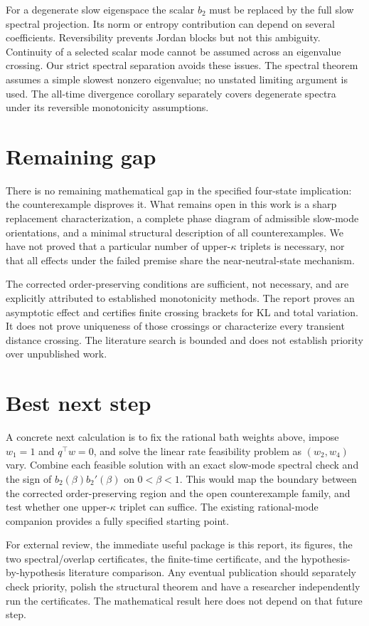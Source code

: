 \documentclass[11pt]{article}
\begin{document}
For a degenerate slow eigenspace the scalar $b_2$ must be replaced by the full slow spectral projection. Its norm or entropy contribution can depend on several coefficients. Reversibility prevents Jordan blocks but not this ambiguity. Continuity of a selected scalar mode cannot be assumed across an eigenvalue crossing. Our strict spectral separation avoids these issues. The spectral theorem assumes a simple slowest nonzero eigenvalue; no unstated limiting argument is used. The all-time divergence corollary separately covers degenerate spectra under its reversible monotonicity assumptions.

\section{Remaining gap}
There is no remaining mathematical gap in the specified four-state implication: the counterexample disproves it. What remains open in this work is a sharp replacement characterization, a complete phase diagram of admissible slow-mode orientations, and a minimal structural description of all counterexamples. We have not proved that a particular number of upper-$\kappa$ triplets is necessary, nor that all effects under the failed premise share the near-neutral-state mechanism.

The corrected order-preserving conditions are sufficient, not necessary, and are explicitly attributed to established monotonicity methods. The report proves an asymptotic effect and certifies finite crossing brackets for KL and total variation. It does not prove uniqueness of those crossings or characterize every transient distance crossing. The literature search is bounded and does not establish priority over unpublished work.

\section{Best next step}
A concrete next calculation is to fix the rational bath weights above, impose $w_1=1$ and $q^\top w=0$, and solve the linear rate feasibility problem as $(w_2,w_4)$ vary. Combine each feasible solution with an exact slow-mode spectral check and the sign of $b_2(\beta)b_2'(\beta)$ on $0<\beta<1$. This would map the boundary between the corrected order-preserving region and the open counterexample family, and test whether one upper-$\kappa$ triplet can suffice. The existing rational-mode companion provides a fully specified starting point.

For external review, the immediate useful package is this report, its figures, the two spectral/overlap certificates, the finite-time certificate, and the hypothesis-by-hypothesis literature comparison. Any eventual publication should separately check priority, polish the structural theorem and have a researcher independently run the certificates. The mathematical result here does not depend on that future step.
\clearpage
\end{document}
